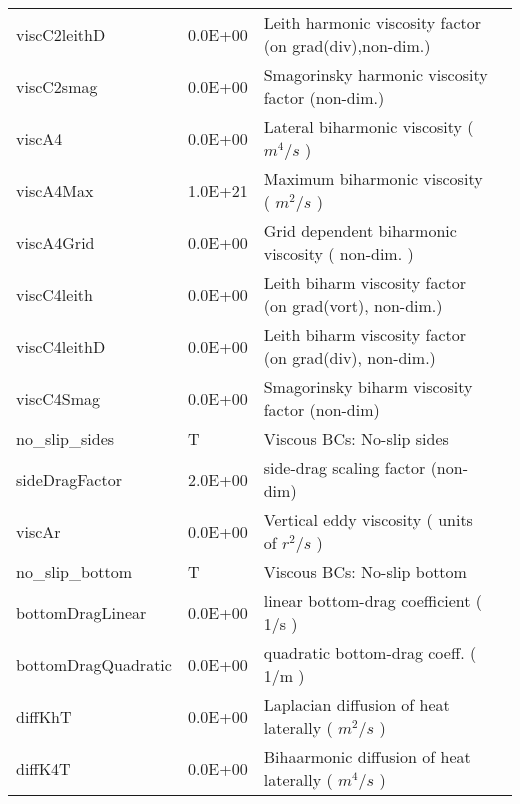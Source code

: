 \begin{table}
\begin{tabular}{lllc}
   viscC2leithD   &                   0.0E+00
    &   Leith harmonic viscosity factor (on grad(div),non-dim.) 
    &  %
    \\
   viscC2smag   &                   0.0E+00
    &   Smagorinsky harmonic viscosity factor (non-dim.) 
    &  %
    \\
   viscA4   &                   0.0E+00
    &   Lateral biharmonic viscosity ( $m^4/s$ ) 
    &  %
    \\
   viscA4Max   &                   1.0E+21
    &   Maximum biharmonic viscosity ( $m^2/s$ ) 
    &  %
    \\
   viscA4Grid   &                   0.0E+00
    &   Grid dependent biharmonic viscosity ( non-dim. ) 
    &  %
    \\
   viscC4leith   &                   0.0E+00
    &   Leith biharm viscosity factor (on grad(vort), non-dim.) 
    &  %
    \\
   viscC4leithD   &                   0.0E+00
    &   Leith biharm viscosity factor (on grad(div), non-dim.) 
    &  %
    \\
   viscC4Smag   &                   0.0E+00
    &   Smagorinsky biharm viscosity factor (non-dim) 
    &  %
    \\
   no\_slip\_sides   &                     T
    &   Viscous BCs: No-slip sides 
    &  %
    \\
   sideDragFactor   &                   2.0E+00
    &   side-drag scaling factor (non-dim) 
    &  %
    \\
   viscAr   &                   0.0E+00
    &   Vertical eddy viscosity ( units of $r^2/s$ ) 
    &  %
    \\
   no\_slip\_bottom   &                     T
    &   Viscous BCs: No-slip bottom 
    &  %
    \\
   bottomDragLinear   &                   0.0E+00
    &   linear bottom-drag coefficient ( 1/s ) 
    &  %
    \\
   bottomDragQuadratic   &                   0.0E+00
    &   quadratic bottom-drag coeff. ( 1/m ) 
    &  %
    \\
   diffKhT   &                   0.0E+00
    &   Laplacian diffusion of heat laterally ( $m^2/s$ ) 
    &  %
    \\
   diffK4T   &                   0.0E+00
    &   Bihaarmonic diffusion of heat laterally ( $m^4/s$ ) 
    &  %
    \\

\end{tabular}
\end{table}
